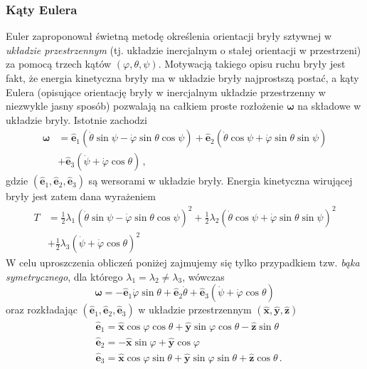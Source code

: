 \documentclass[../main.tex]{subfiles}
\begin{document}
\subsubsection{Kąty Eulera}
Euler zaproponował świetną metodę określenia orientacji bryły sztywnej w \textit{układzie
przestrzennym} (tj. układzie inercjalnym o stałej orientacji w przestrzeni) za pomocą trzech kątów
\((\varphi, \theta,\psi )\). Motywacją takiego opisu ruchu bryły jest fakt, że energia kinetyczna
bryły ma w układzie bryły najprostszą postać, a kąty Eulera (opisujące orientację bryły w
inercjalnym układzie przestrzenny w niezwykle jasny sposób) pozwalają na całkiem proste rozłożenie
\(\boldsymbol{\omega}\) na składowe w układzie bryły. Istotnie zachodzi
\begin{equation*}
\begin{split}
    \boldsymbol{\omega}&=\mathbf{\hat e}_1(\dot\theta \sin\psi-\dot\varphi\sin\theta\cos\psi)+\mathbf{\hat e}_2(\dot\theta\cos\psi+\dot\varphi\sin\theta\sin\psi)\\
    &+\mathbf{\hat e}_3(\dot\psi+\dot\varphi\cos\theta)\,,
\end{split}
\end{equation*}
gdzie \((\mathbf{\hat e}_1,\mathbf{\hat e}_2,\mathbf{\hat e}_3)\) są wersorami w układzie bryły.
Energia kinetyczna wirującej bryły jest zatem dana wyrażeniem
\begin{equation*}
\begin{split}
    T&=\frac{1}{2}\lambda_1(\dot\theta \sin\psi-\dot\varphi\sin\theta\cos\psi)^2+\frac{1}{2}\lambda_2(\dot\theta\cos\psi+\dot\varphi\sin\theta\sin\psi)^2\\
    &+\frac{1}{2}\lambda_3(\dot\psi+\dot\varphi\cos\theta)^2
\end{split}
\end{equation*}
W celu uproszczenia obliczeń poniżej zajmujemy się tylko przypadkiem tzw. \textit{bąka
symetrycznego}, dla którego \(\lambda_1=\lambda_2\neq\lambda_3\), wówczas 
\begin{equation*}
    \boldsymbol{\omega}=-\mathbf{\hat{e}}_1\dot\varphi\sin\theta+\mathbf{\hat{e}}_2\dot\theta+\mathbf{\hat{e}}_3(\dot\psi+\dot\varphi\cos\theta)
\end{equation*}
oraz rozkładając \((\mathbf{\hat e}_1,\mathbf{\hat e}_2,\mathbf{\hat e}_3)\) w układzie
przestrzennym \((\mathbf{\hat{x}},\mathbf{\hat{y}},\mathbf{\hat{z}})\)
\begin{equation*}
    \begin{split}
        &\mathbf{\hat{e}}_1=\mathbf{\hat{x}}\cos\varphi\cos\theta+\mathbf{\hat{y}}\sin\varphi\cos\theta-\mathbf{\hat{z}}\sin\theta\\
        &\mathbf{\hat{e}}_2=-\mathbf{\hat{x}}\sin\varphi+\mathbf{\hat{y}}\cos\varphi\\
        &\mathbf{\hat{e}}_3=\mathbf{\hat{x}}\cos\varphi\sin\theta+\mathbf{\hat{y}}\sin\varphi\sin\theta+\mathbf{\hat{z}}\cos\theta\,.
    \end{split}
\end{equation*}
\end{document}
